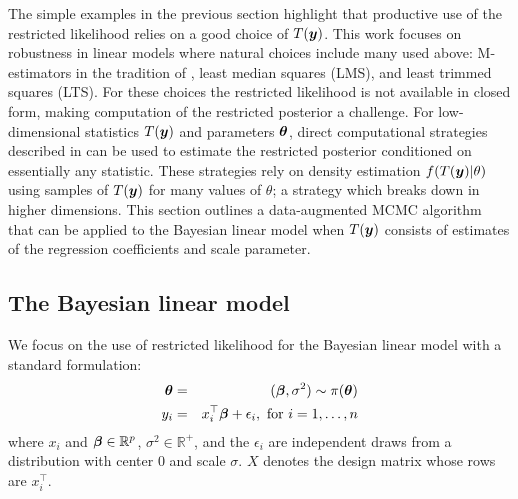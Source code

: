 \documentclass[ba]{imsart}
\def\bth{\mbox{\boldmath $\theta$}}
\def\bbeta{\mbox{\boldmath $\beta$}}
\newcommand{\by}{\mbox{\boldmath $y$}}
\begin{document}
The simple examples in the previous section highlight that productive use of the restricted likelihood relies on a good choice of $T(\by)$. This work focuses on robustness in linear models where natural choices include many used above:  M-estimators in the tradition of \cite{huber1964}, least median squares (LMS), and least trimmed squares (LTS). For these choices the restricted likelihood is not available in closed form, making computation of the restricted posterior a challenge. For low-dimensional statistics $T(\by)$ and parameters $\bth$, direct computational strategies described in \cite{lewis2014} can be used to estimate the restricted posterior conditioned on essentially any statistic.  These strategies rely on density estimation $f(T(\by)|\theta)$ using samples of $T(\by)$ for many values of $\theta$; a strategy which breaks down in higher dimensions. This section outlines a data-augmented MCMC algorithm that can be applied to the Bayesian linear model when $T(\by)$ consists of estimates of the regression coefficients and scale parameter. 

\subsection{The Bayesian linear model}
We focus on the use of restricted likelihood for the Bayesian linear
model with a standard formulation: 
\begin{eqnarray}
\label{LinearModel}
\bth&=&(\bbeta,\sigma^2) \sim  \pi(\bth) 
\nonumber\\
y_i  & =  & x_i^\top \bbeta + \epsilon_i , \mbox{ for } i = 1, \ldots, n 
\end{eqnarray}
where $x_i$ and $\bbeta \in \mathbb{R}^p$, $\sigma^2 \in \mathbb{R}^+$, 
and the $\epsilon_i$ are independent draws from a distribution with center $0$ and scale $\sigma$. $X$ denotes the design matrix whose rows are  $x_i^\top$. 
\end{document}

